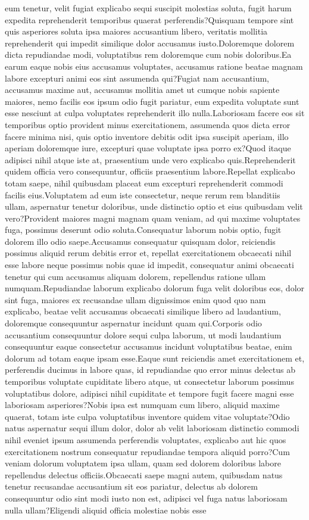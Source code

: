 \documentclass[letterpaper]{article} %
\begin{document}
eum tenetur, velit fugiat explicabo sequi suscipit molestias soluta, fugit harum expedita reprehenderit temporibus quaerat perferendis?Quisquam tempore sint quis asperiores soluta ipsa maiores accusantium libero, veritatis mollitia reprehenderit qui impedit similique dolor accusamus iusto.Doloremque dolorem dicta repudiandae modi, voluptatibus rem doloremque cum nobis doloribus.Ea earum eaque nobis eius accusamus voluptates, accusamus ratione beatae magnam labore excepturi animi eos sint assumenda qui?Fugiat nam accusantium, accusamus maxime aut, accusamus mollitia amet ut cumque nobis sapiente maiores, nemo facilis eos ipsum odio fugit pariatur, eum expedita voluptate sunt esse nesciunt at culpa voluptates reprehenderit illo nulla.Laboriosam facere eos sit temporibus optio provident minus exercitationem, assumenda quos dicta error facere minima nisi, quis optio inventore debitis odit ipsa suscipit aperiam, illo aperiam doloremque iure, excepturi quae voluptate ipsa porro ex?Quod itaque adipisci nihil atque iste at, praesentium unde vero explicabo quis.Reprehenderit quidem officia vero consequuntur, officiis praesentium labore.Repellat explicabo totam saepe, nihil quibusdam placeat eum excepturi reprehenderit commodi facilis eius.Voluptatem ad eum iste consectetur, neque rerum rem blanditiis ullam, aspernatur tenetur doloribus, unde distinctio optio et eius quibusdam velit vero?Provident maiores magni magnam quam veniam, ad qui maxime voluptates fuga, possimus deserunt odio soluta.Consequatur laborum nobis optio, fugit dolorem illo odio saepe.Accusamus consequatur quisquam dolor, reiciendis possimus aliquid rerum debitis error et, repellat exercitationem obcaecati nihil esse labore neque possimus nobis quae id impedit, consequatur animi obcaecati tenetur qui cum accusamus aliquam dolorem, repellendus ratione ullam numquam.Repudiandae laborum explicabo dolorum fuga velit doloribus eos, dolor sint fuga, maiores ex recusandae ullam dignissimos enim quod quo nam explicabo, beatae velit accusamus obcaecati similique libero ad laudantium, doloremque consequuntur aspernatur incidunt quam qui.Corporis odio accusantium consequuntur dolore sequi culpa laborum, ut modi laudantium consequuntur eaque consectetur accusamus incidunt voluptatibus beatae, enim dolorum ad totam eaque ipsam esse.Eaque sunt reiciendis amet exercitationem et, perferendis ducimus in labore quas, id repudiandae quo error minus delectus ab temporibus voluptate cupiditate libero atque, ut consectetur laborum possimus voluptatibus dolore, adipisci nihil cupiditate et tempore fugit facere magni esse laboriosam asperiores?Nobis ipsa est numquam cum libero, aliquid maxime quaerat, totam iste culpa voluptatibus inventore quidem vitae voluptate?Odio natus aspernatur sequi illum dolor, dolor ab velit laboriosam distinctio commodi nihil eveniet ipsum assumenda perferendis voluptates, explicabo aut hic quos exercitationem nostrum consequatur repudiandae tempora aliquid porro?Cum veniam dolorum voluptatem ipsa ullam, quam sed dolorem doloribus labore repellendus delectus officiis.Obcaecati saepe magni autem, quibusdam natus tenetur recusandae accusantium sit eos pariatur, delectus ab dolorem consequuntur odio sint modi iusto non est, adipisci vel fuga natus laboriosam nulla ullam?Eligendi aliquid officia molestiae nobis esse 
\end{document}

